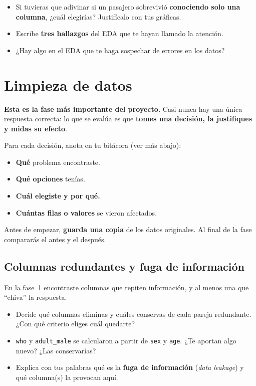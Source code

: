 \documentclass[11pt,a4paper]{article}
\newcommand{\col}[1]{\texttt{#1}}
\begin{document}
\begin{preguntas}
\begin{itemize}
  \item Si tuvieras que adivinar si un pasajero sobrevivió \textbf{conociendo solo una
        columna}, ¿cuál elegirías? Justifícalo con tus gráficas.
  \item Escribe \textbf{tres hallazgos} del EDA que te hayan llamado la atención.
  \item ¿Hay algo en el EDA que te haga sospechar de errores en los datos?
\end{itemize}
\end{preguntas}

\section{Limpieza de datos}

\begin{aviso}
\textbf{Esta es la fase más importante del proyecto.} Casi nunca hay una única respuesta
correcta: lo que se evalúa es que \textbf{tomes una decisión, la justifiques y midas su
efecto}.
\end{aviso}

Para cada decisión, anota en tu bitácora (ver más abajo):
\begin{itemize}
  \item \textbf{Qué} problema encontraste.
  \item \textbf{Qué opciones} tenías.
  \item \textbf{Cuál elegiste y por qué.}
  \item \textbf{Cuántas filas o valores} se vieron afectados.
\end{itemize}

Antes de empezar, \textbf{guarda una copia} de los datos originales. Al final de la fase
compararás el antes y el después.

\subsection{Columnas redundantes y fuga de información}

En la fase~1 encontraste columnas que repiten información, y al menos una que
``chiva'' la respuesta.
\begin{itemize}
  \item Decide qué columnas eliminas y cuáles conservas de cada pareja redundante.
        ¿Con qué criterio eliges cuál quedarte?
  \item \col{who} y \col{adult\_male} se calcularon a partir de \col{sex} y \col{age}.
        ¿Te aportan algo nuevo? ¿Las conservarías?
  \item Explica con tus palabras qué es la \textbf{fuga de información}
        (\emph{data leakage}) y qué columna(s) la provocan aquí.
\end{itemize}
\end{document}
